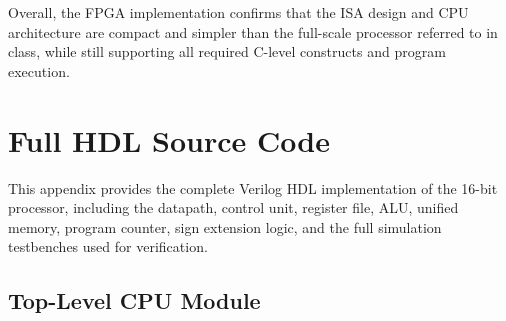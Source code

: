 \documentclass[12pt]{report}
\begin{document}
Overall, the FPGA implementation confirms that the ISA design and CPU
architecture are compact and simpler than the
full-scale processor referred to in class, while still supporting all required
C-level constructs and program execution.

\appendix
\chapter{Full HDL Source Code}
This appendix provides the complete Verilog HDL implementation of the 16-bit processor, including the datapath, control unit, register file, ALU, unified memory, program counter, sign extension logic, and the full simulation
testbenches used for verification.

\section{Top-Level CPU Module}
\end{document}
